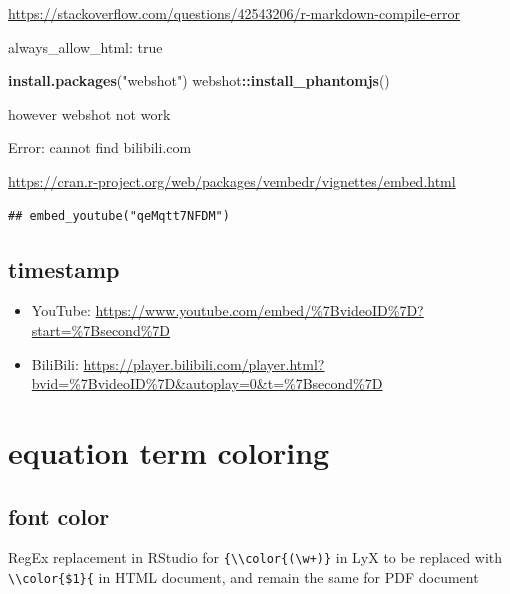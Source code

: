 \documentclass[
]{book}
\newenvironment{Shaded}{\begin{snugshade}}{\end{snugshade}}
\newcommand{\FunctionTok}[1]{\textcolor[rgb]{0.13,0.29,0.53}{\textbf{#1}}}
\newcommand{\NormalTok}[1]{#1}
\newcommand{\SpecialCharTok}[1]{\textcolor[rgb]{0.81,0.36,0.00}{\textbf{#1}}}
\newcommand{\StringTok}[1]{\textcolor[rgb]{0.31,0.60,0.02}{#1}}
\providecommand{\tightlist}{%
  \setlength{\itemsep}{0pt}\setlength{\parskip}{0pt}}
\theoremstyle{definition}
\theoremstyle{definition}
\theoremstyle{definition}
\theoremstyle{definition}
\theoremstyle{remark}
\begin{document}
\url{https://stackoverflow.com/questions/42543206/r-markdown-compile-error}

always\_allow\_html: true

\begin{Shaded}
\begin{Highlighting}[]
\FunctionTok{install.packages}\NormalTok{(}\StringTok{"webshot"}\NormalTok{)}
\NormalTok{webshot}\SpecialCharTok{::}\FunctionTok{install\_phantomjs}\NormalTok{()}
\end{Highlighting}
\end{Shaded}

however webshot not work

Error: cannot find bilibili.com

\url{https://cran.r-project.org/web/packages/vembedr/vignettes/embed.html}

\begin{verbatim}
## embed_youtube("qeMqtt7NFDM")
\end{verbatim}

\hypertarget{timestamp}{%
\subsection{timestamp}\label{timestamp}}

\begin{itemize}
\tightlist
\item
  YouTube: \url{https://www.youtube.com/embed/\%7BvideoID\%7D?start=\%7Bsecond\%7D}
\item
  BiliBili: \url{https://player.bilibili.com/player.html?bvid=\%7BvideoID\%7D\&autoplay=0\&t=\%7Bsecond\%7D}
\end{itemize}

\hypertarget{equation-term-coloring}{%
\section{equation term coloring}\label{equation-term-coloring}}

\hypertarget{font-color}{%
\subsection{font color}\label{font-color}}

RegEx replacement in RStudio for \texttt{\{\textbackslash{}\textbackslash{}color\{(\textbackslash{}w+)\}} in LyX to be replaced with \texttt{\textbackslash{}\textbackslash{}color\{\$1\}\{} in HTML document, and remain the same for PDF document
\end{document}

